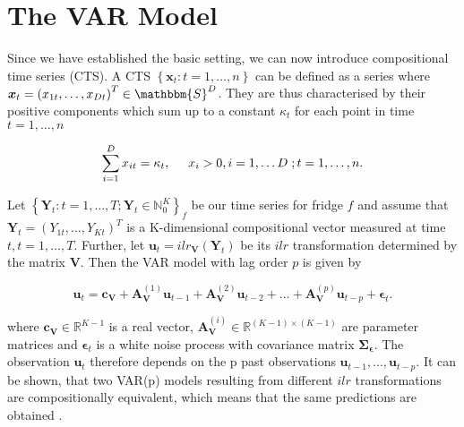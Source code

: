 \section{The VAR Model}
\label{sec:The VAR Model}

Since we have established the basic setting, we can now introduce compositional time series (CTS). A CTS $\left\{\bm{x}_t:t=1,\ldots,n \right\}$ can be defined as a series where $\bm{x}_t = \left(x_{1t},\ldots,x_{Dt}\right)^T \in \mathbbm{S}^D$. They are thus characterised by their positive components which sum up to a constant $\kappa_t$ for each point in time $t=1,\ldots,n$ 

\begin{equation}
\sum_{i=1}^D x_{it} = \kappa_t, \hspace{0.5cm} x_i > 0, i=1,\ldots D \hspace{0.1cm}; t=1,\ldots, n. 
\label{eq:CTS characterisation}
\end{equation} 

Let $\left\{\bm{Y}_t:t=1,\ldots,T; \bm{Y}_t \in \mathbb{N}_0^K \right\}_f$ be our time series for fridge $f$ and assume that $\bm{Y}_t=(Y_{1t},\ldots,Y_{Kt})^T$ is a K-dimensional compositional vector measured at time $t, t=1,\ldots,T$. Further, let $\textbf{u}_t = ilr_{\bm{V}}(\bm{Y}_t)$ be its $ilr$ transformation determined by the matrix $\textbf{V}$. Then the VAR model with lag order $p$ is given by \cite{Kynclova:2015}

\begin{equation}
\textbf{u}_t = \textbf{c}_{\textbf{V}} + \textbf{A}_{\textbf{V}}^{(1)}\textbf{u}_{t-1} + \textbf{A}_{\textbf{V}}^{(2)}\textbf{u}_{t-2} + \ldots + \textbf{A}_{\textbf{V}}^{(p)}\textbf{u}_{t-p} + \bm{\epsilon}_{t}.
\label{eq:VAR model}
\end{equation}

where $\textbf{c}_{\textbf{V}} \in \mathbb{R}^{K-1}$ is a real vector, $\textbf{A}_{\textbf{V}}^{(i)} \in \mathbb{R}^{(K-1) \times (K-1)}$ are parameter matrices and $\bm{\epsilon}_t$ is a white noise process with covariance matrix $\bm{\Sigma_\epsilon}$. The observation $\textbf{u}_t$ therefore depends on the p past observations $\textbf{u}_{t-1},\ldots,\textbf{u}_{t-p}$. It can be shown, that two VAR(p) models resulting from different $ilr$ transformations are compositionally equivalent, which means that the same predictions are obtained \cite{Kynclova:2015}. 



